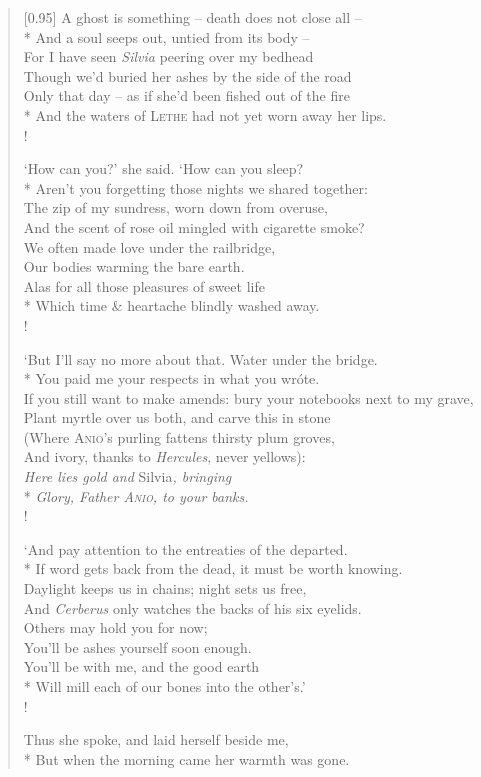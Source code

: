 \begin{verse}[0.95\textwidth]
A ghost is something -- death does not close all --\\*
\vin And a soul seeps out, untied from its body --\\
For I have seen \textit{Silvia} peering over my bedhead\\
\vin Though we'd buried her ashes by the side of the road\\
Only that day -- as if she'd been fished out of the fire\\*
\vin And the waters of \textsc{Lethe} had not yet worn away her lips.\\!

`How can you?' she said. `How can you sleep?\\*
\vin Aren't you forgetting those nights we shared together:\nobreak\\
The zip of my sundress, worn down from overuse,\\
\vin And the scent of rose oil mingled with cigarette smoke?\\
We often made love under the railbridge,\\
\vin Our bodies warming the bare earth.\\
Alas for all those pleasures of sweet life\\*
\vin Which time \& heartache blindly washed away.\\!

`But I'll say no more about that. Water under the bridge.\nobreak\\*
\vin You paid me your respects in what you wr\'ote.\\
If you still want to make amends: bury your notebooks next to my grave,\\
\vin Plant myrtle over us both, and carve this in stone\\
(Where \textsc{Anio}'s purling fattens thirsty plum groves,\\
\vin And ivory, thanks to \textit{Hercules}, never yellows):\\
\textit{Here lies gold and }Silvia\textit{, bringing}\\*
\vin \textit{Glory, Father \textsc{Anio}, to your banks.}\\!

`And pay attention to the entreaties of the departed.\\*
\vin If word gets back from the dead, it must be worth knowing.\\
Daylight keeps us in chains; night sets us free,\\
\vin And \textit{Cerberus} only watches the backs of his six eyelids.\nobreak\\
Others may hold you for now;\\
\vin You'll be ashes yourself soon enough.\\
You'll be with me, and the good earth\\*
\vin Will mill each of our bones into the other's.'\\!

Thus she spoke, and laid herself beside me,\\*
\vin But when the morning came her warmth was gone.
\end{verse}

